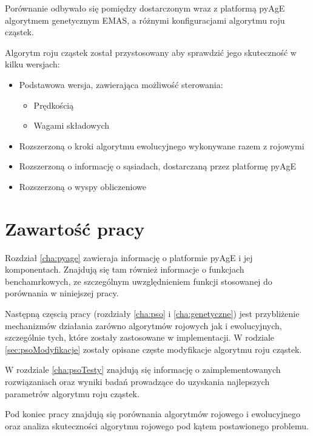 Porównanie odbywało się pomiędzy dostarczonym wraz z platformą pyAgE algorytmem genetycznym EMAS, a różnymi konfiguracjami algorytmu roju cząstek. 

Algorytm roju cząstek został przystosowany aby sprawdzić jego skuteczność w kilku wersjach:
\begin{itemize}
\item Podstawowa wersja, zawierająca możliwość sterowania:
\begin{itemize}
\item Prędkością
\item Wagami składowych
\end{itemize}
\item Rozszerzoną o kroki algorytmu ewolucyjnego wykonywane razem z rojowymi
\item Rozszerzoną o informację o sąsiadach, dostarczaną przez platformę pyAgE
\item Rozszerzoną o wyspy obliczeniowe
\end{itemize}


\section{Zawartość pracy}
Rozdział \ref{cha:pyage} zawieraja informację o platformie pyAgE i jej komponentach. Znajdują się tam również informacje o funkcjach benchamrkowych, ze szczególnym uwzględnieniem funkcji stosowanej do porównania w niniejszej pracy.

Następną częscią pracy (rozdziały \ref{cha:pso} i \ref{cha:genetyczne}) jest przybliżenie mechanizmów działania zarówno algorytmów rojowych jak i ewolucyjnych, szczególnie tych, które zostały zastosowane w implementacji. W rodziale \ref{sec:psoModyfikacje} zostały opisane częste modyfikacje algorytmu roju cząstek.

W rozdziale \ref{cha:psoTesty} znajdują się informację o zaimplementowanych rozwiązaniach oraz wyniki badań prowadzące do uzyskania najlepszych parametrów algorytmu roju cząstek.

Pod koniec pracy znajdują się porównania algorytmów rojowego i ewolucyjnego oraz analiza skuteczności algorytmu rojowego pod kątem postawionego problemu.











